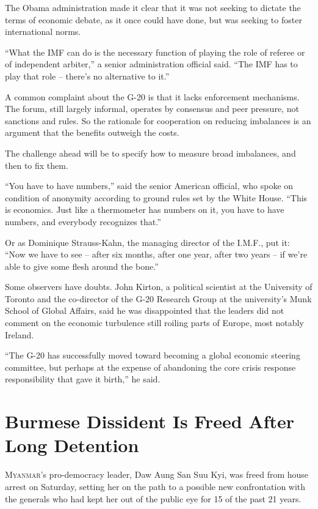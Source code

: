 ﻿\documentclass[12pt]{article}
\begin{document}
The Obama administration made it clear that it was not seeking to dictate the terms of economic
debate, as it once could have done, but was seeking to foster international norms.

``What the IMF can do is the necessary function of playing the role of referee or of independent
arbiter,'' a senior administration official said. ``The IMF has to play that role – there's no
alternative to it.''

A common complaint about the G-20 is that it lacks enforcement mechanisms. The forum, still largely
informal, operates by consensus and peer pressure, not sanctions and rules. So the rationale for
cooperation on reducing imbalances is an argument that the benefits outweigh the costs.

The challenge ahead will be to specify how to measure broad imbalances, and then to fix them.

``You have to have numbers,'' said the senior American official, who spoke on condition of anonymity
according to ground rules set by the White House. ``This is economics. Just like a thermometer has
numbers on it, you have to have numbers, and everybody recognizes that.''

Or as Dominique Strauss-Kahn, the managing director of the I.M.F., put it: ``Now we have to see --
after six months, after one year, after two years -- if we're able to give some flesh around the
bone.''

Some observers have doubts. John Kirton, a political scientist at the University of Toronto and the
co-director of the G-20 Research Group at the university's Munk School of Global Affairs, said he
was disappointed that the leaders did not comment on the economic turbulence still roiling parts of
Europe, most notably Ireland.

``The G-20 has successfully moved toward becoming a global economic steering committee, but perhaps
at the expense of abandoning the core crisis response responsibility that gave it birth,'' he said.

\section{Burmese Dissident Is Freed After Long Detention}

\lettrine{M}{yanmar}'s pro-democracy leader, Daw Aung San Suu Kyi, was freed
from house arrest on Saturday, setting her on the path to a possible new confrontation with the
generals who had kept her out of the public eye for 15 of the past 21 years.
\end{document}
